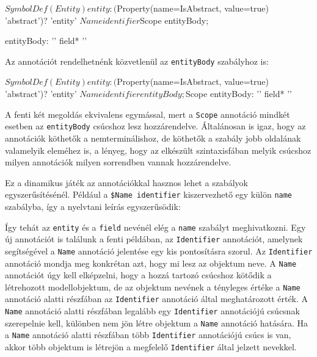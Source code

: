 \documentclass[12pt, a4paper]{report}
\newcommand{\f}[1]{\texttt{#1}}
\begin{document}
\begin{antlr4code}
$SymbolDef(Entity)
entity: ($Property(name=IsAbstract, value=true) 'abstract')? 'entity' $Name identifier $Scope entityBody;

entityBody: '{' field* '}'
\end{antlr4code}

Az annotációt rendelhetnénk közvetlenül az \f{entityBody} szabályhoz is:

\begin{antlr4code}
$SymbolDef(Entity)
entity: ($Property(name=IsAbstract, value=true) 'abstract')? 'entity' $Name identifier entityBody;

$Scope
entityBody: '{' field* '}'
\end{antlr4code}

A fenti két megoldás ekvivalens egymással, mert a \f{Scope} annotáció mindkét esetben az \f{entityBody} csúcshoz lesz hozzárendelve. Általánosan is igaz, hogy az annotációk köthetők a nemterminálishoz, de köthetők a szabály jobb oldalának valamelyik eleméhez is, a lényeg, hogy az elkészült szintaxisfában melyik csúcshoz milyen annotációk milyen sorrendben vannak hozzárendelve.

Ez a dinamikus játék az annotációkkal hasznos lehet a szabályok egyszerűsítésénél. Például a \f{\$Name identifier} kiszervezhető egy külön \f{name} szabályba, így a nyelvtani leírás egyszerűsödik:

Így tehát az \f{entity} és a \f{field} nevénél elég a \f{name} szabályt meghivatkozni. Egy új annotációt is találunk a fenti példában, az \f{Identifier} annotációt, amelynek segítségével a \f{Name} annotáció jelentése egy kis pontosításra szorul. Az \f{Identifier} annotáció mondja meg konkrétan azt, hogy mi lesz az objektum neve. A \f{Name} annotációt úgy kell elképzelni, hogy a hozzá tartozó csúcshoz kötődik a létrehozott modellobjektum, de az objektum nevének a tényleges értéke a \f{Name} annotáció alatti részfában az \f{Identifier} annotáció által meghatározott érték. A \f{Name} annotáció alatti részfában legalább egy \f{Identifier} annotációjú csúcsnak szerepelnie kell, különben nem jön létre objektum a \f{Name} annotáció hatására. Ha a \f{Name} annotáció alatti részfában több \f{Identifier} annotációjú csúcs is van, akkor több objektum is létrejön a megfelelő \f{Identifier} által jelzett nevekkel.
\end{document}
